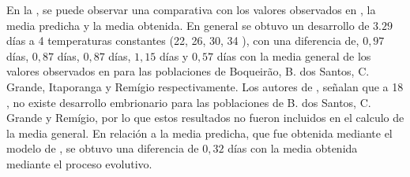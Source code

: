 En la , se puede observar una comparativa con los
valores observados en \cite{BESERRA2006}, la media predicha y la media obtenida. En general se
obtuvo un desarrollo de $3.29$ días a 4 temperaturas constantes (22, 26, 30, 34 \textcelsius), con
una diferencia de, $0,97$ días, $0,87$ días, $0,87$ días, $1,15$ días y $0,57$ días con la media
general de los valores observados en \cite{BESERRA2006} para las poblaciones de Boqueirão, B. dos
Santos, C. Grande, Itaporanga y Remígio respectivamente. Los autores de \cite{BESERRA2006},
señalan que a 18 \textcelsius, no existe desarrollo embrionario para las poblaciones de B. dos
Santos, C. Grande y Remígio, por lo que estos resultados no fueron incluidos en el calculo de la
media general. En relación a la media predicha, que fue obtenida mediante el modelo de
\cite{sharpe1977reaction}, se obtuvo una diferencia de $0,32$ días con la media obtenida mediante
el proceso evolutivo.

